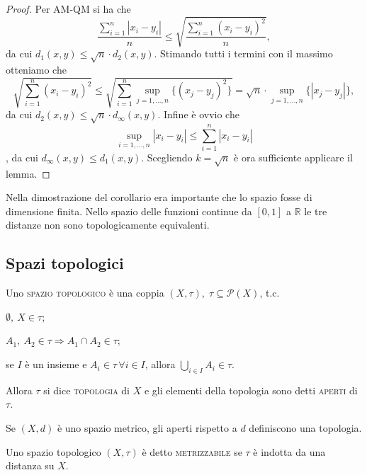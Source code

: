 \documentclass{article}
\begin{document}
\begin{proof}
    Per AM-QM si ha che $$\displaystyle \frac{\sum_{i=1}^n |x_i-y_i|}{n} \le
    \sqrt{\frac{\sum_{i=1}^n (x_i-y_i)^2}{n}},$$ da cui $d_1(x, y) \le \sqrt{n}
    \cdot d_2(x, y)$. Stimando tutti i termini con il massimo otteniamo che
    $$\displaystyle \sqrt{\sum_{i=1}^n (x_i-y_i)^2} \le \sqrt{\sum_{i=1}^n
    \sup_{j=1, \dots, n} \{(x_j-y_j)^2\}}=\sqrt{n} \cdot \sup_{j=1, \dots, n} \{
    |x_j-y_j| \},$$ da cui $d_2(x, y) \le \sqrt{n} \cdot d_{\infty} (x, y).$
    Infine è ovvio che $$\displaystyle \sup_{i=1, \dots, n} |x_i-y_i| \le
    \sum_{i=1}^n |x_i-y_i|$$, da cui $d_{\infty}(x, y) \le d_1(x, y).$
    Scegliendo $k=\sqrt{n}$ è ora sufficiente applicare il lemma.
\end{proof}

Nella dimostrazione del corollario era importante che lo spazio fosse di
dimensione finita. Nello spazio delle funzioni continue da $[0, 1]$ a
$\mathbb{R}$ le tre distanze non sono topologicamente equivalenti.

\subsection{Spazi topologici}

\begin{defn}
    Uno \textsc{spazio topologico} è una coppia $(X, \tau),\; {\tau \subseteq
    \mathcal{P}(X)}$, t.c.
    \begin{nlist}
        \item $\emptyset,\ X \in \tau$;
        \item $A_1,\ A_2 \in \tau \Rightarrow A_1 \cap A_2 \in \tau$;
        \item se $I$ è un insieme e $A_i \in \tau \, \forall i \in I$, allora
        $\displaystyle \bigcup_{i \in I} A_i \in \tau$.
    \end{nlist}
    Allora $\tau$ si dice \textsc{topologia} di $X$ e gli elementi della
    topologia sono detti \textsc{aperti} di $\tau$.
\end{defn}

\begin{prop}
    Se $(X, d)$ è uno spazio metrico, gli aperti rispetto a $d$ definiscono una
    topologia.
\end{prop}

\begin{defn}
    Uno spazio topologico $(X, \tau)$ è detto \textsc{metrizzabile} se $\tau$ è
    indotta da una distanza su $X$.
\end{defn}
\end{document}
